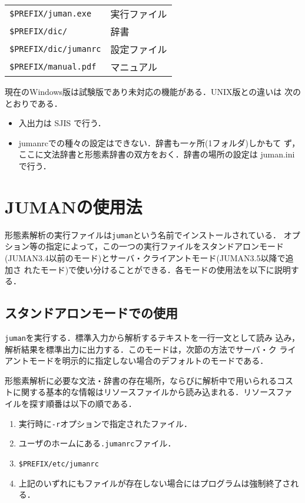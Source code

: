 \documentclass[a4j,titlepage]{jarticle}
\begin{document}
\begin{tabular}{ll}
 \texttt{\$PREFIX/juman.exe} & 実行ファイル \\
 \texttt{\$PREFIX/dic/} & 辞書 \\
 \texttt{\$PREFIX/dic/jumanrc} & 設定ファイル \\
 \texttt{\$PREFIX/manual.pdf} & マニュアル \\
\end{tabular}

\vspace*{3ex}

現在のWindows版は試験版であり未対応の機能がある．UNIX版との違いは
次のとおりである．
\begin{itemize}
 \item 入出力は SJIS で行う．
 \item jumanrcでの種々の設定はできない．辞書も一ヶ所(1フォルダ)しかもて
       ず，ここに文法辞書と形態素辞書の双方をおく．辞書の場所の設定は
       juman.iniで行う．
\end{itemize}


\section{JUMANの使用法}\label{use}

形態素解析の実行ファイルは{\tt juman}という名前でインストールされている．
オプション等の指定によって，この一つの実行ファイルをスタンドアロンモード
(JUMAN3.4以前のモード)とサーバ・クライアントモード(JUMAN3.5以降で追加さ
れたモード)で使い分けることができる．各モードの使用法を以下に説明する．

\subsection{スタンドアロンモードでの使用}
\label{use-standalone}

{\tt juman}を実行する．標準入力から解析するテキストを一行一文として読み
込み，解析結果を標準出力に出力する．このモードは，次節の方法でサーバ・ク
ライアントモードを明示的に指定しない場合のデフォルトのモードである．

形態素解析に必要な文法・辞書の存在場所，ならびに解析中で用いられるコス
トに関する基本的な情報はリソースファイルから読み込まれる．リソースファ
イルを探す順番は以下の順である．
\begin{enumerate}
\item 実行時に{\tt -r}オプションで指定されたファイル．
\item ユーザのホームにある{\tt .jumanrc}ファイル．
\item \texttt{\$PREFIX/etc/jumanrc}
\item 上記のいずれにもファイルが存在しない場合にはプログラムは強制終了される．
\end{enumerate}
\end{document}
